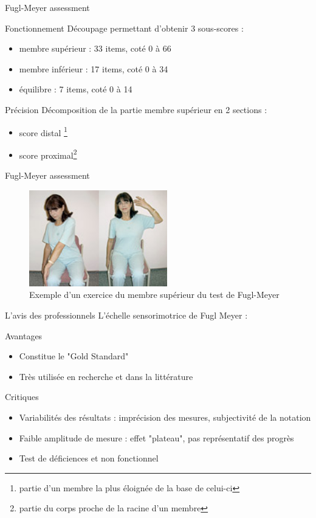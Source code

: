\begin{frame}{Fugl-Meyer assessment}
	\begin{block}{Fonctionnement}
		Découpage permettant d'obtenir 3 sous-scores : 
		\begin{itemize}
			\item membre supérieur : 33 items, coté 0 à 66
			\item membre inférieur : 17 items, coté 0 à 34
			\item équilibre : 7 items, coté 0 à 14
		\end{itemize}
	\end{block}
	\begin{block}{Précision}
		Décomposition de  la partie membre supérieur en 2 sections : 
		\begin{itemize}
			\item score distal \footnote{partie d’un membre la plus éloignée de la base de celui-ci} 
			\item score proximal\footnote{partie du corps proche de la racine d’un membre}
		\end{itemize}
	\end{block}	
\end{frame}

\begin{frame}{Fugl-Meyer assessment}
	\begin{figure}
	\centering
	\includegraphics[width=6cm]{../images/fuglmeyer_example.png}
	\caption{Exemple d’un exercice du membre supérieur du test de Fugl-Meyer}
	\end{figure}
\end{frame}

\begin{frame}{L'avis des professionnels}
L'échelle sensorimotrice de Fugl Meyer :
	\begin{exampleblock}{Avantages}
			\begin{itemize}
			\item Constitue le "Gold Standard"
			\item Très utilisée en recherche et dans la littérature 
		\end{itemize}
	\end{exampleblock}
	\begin{alertblock}{Critiques}
			\begin{itemize}
			\item Variabilités des résultats : imprécision des mesures, subjectivité de la notation
			\item Faible amplitude de mesure : effet "plateau", pas représentatif des progrès 
			\item Test de déficiences et non fonctionnel
		\end{itemize}
	\end{alertblock}	
\end{frame}